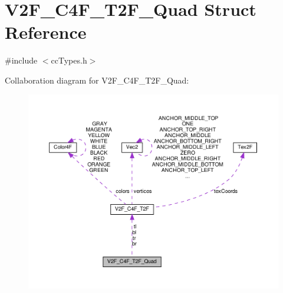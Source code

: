 \hypertarget{structV2F__C4F__T2F__Quad}{}\section{V2\+F\+\_\+\+C4\+F\+\_\+\+T2\+F\+\_\+\+Quad Struct Reference}
\label{structV2F__C4F__T2F__Quad}


{\ttfamily \#include $<$cc\+Types.\+h$>$}



Collaboration diagram for V2\+F\+\_\+\+C4\+F\+\_\+\+T2\+F\+\_\+\+Quad\+:
\nopagebreak
\begin{figure}[H]
\begin{center}
\leavevmode
\includegraphics[width=350pt]{structV2F__C4F__T2F__Quad__coll__graph}
\end{center}
\end{figure}
